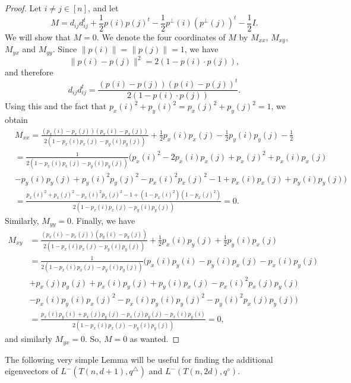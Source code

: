 \documentclass[a4paper,11pt]{article}
\theoremstyle{plain}
\theoremstyle{definition}
\begin{document}
\begin{proof}
Let $i\neq j\in[n]$, and let
\[
    M= d_{i j} d_{i j}^t+ \frac{1}{2} p(i)p(j)^t- \frac{1}{2}p^{\perp}(i) (p^{\perp}(j))^t  - \frac{1}{2} I.
\]
We will show that $M=0$. We denote the four coordinates of $M$ by $M_{x x}$, $M_{x y}$, $M_{y x}$ and $M_{y y}$. Since $\|p(i)\|=\|p(j)\|=1$, we have
\[
    \|p(i)-p(j)\|^2 = 2(1-p(i)\cdot p(j)),
\]
and therefore
\[
d_{i j} d_{i j}^t= \frac{(p(i)-p(j))(p(i)-p(j))^t}{2(1-p(i)\cdot p(j))}.
\]
Using this and the fact that $p_x(i)^2+p_y(i)^2=p_x(j)^2+p_y(j)^2=1$, we obtain
\begin{align*}
&M_{x x}= \frac{(p_x(i)-p_x(j))(p_x(i)-p_x(j))}{2(1-p_x(i)p_x(j)-p_y(i)p_y(j))} +\frac{1}{2}p_x(i)p_x(j)-\frac{1}{2}p_y(i)p_y(j)-\frac{1}{2}
\\&= \frac{1}{2(1-p_x(i)p_x(j)-p_y(i)p_y(j))}\big( p_x(i)^2-2p_x(i)p_x(j)+p_x(j)^2 +p_x(i)p_x(j)\\&-p_y(i)p_y(j)
+p_y(i)^2p_y(j)^2-p_x(i)^2 p_x(j)^2 -1 +p_x(i)p_x(j)+p_y(i)p_y(j)
\big)
\\
&=\frac{p_x(i)^2 + p_x(j)^2 -p_x(i)^2p_x(j)^2-1 +(1-p_x(i)^2)(1-p_x(j)^2)}{2(1-p_x(i)p_x(j)-p_y(i)p_y(j))}=0.
\end{align*}
Similarly, $M_{y y}=0$. Finally, we have
\begin{align*}
M_{x y}&= \frac{(p_x(i)-p_x(j))(p_y(i)-p_y(j))}{2(1-p_x(i)p_x(j)-p_y(i)p_y(j))} +\frac{1}{2}p_x(i)p_y(j)+\frac{1}{2}p_y(i)p_x(j)
\\&= 
\frac{1}
{2(1-p_x(i)p_x(j)-p_y(i)p_y(j))}
\big(
p_x(i)p_y(i)-p_y(i)p_x(j)-p_x(i)p_y(j)\\&+p_x(j)p_y(j)
+p_x(i)p_y(j)+p_y(i)p_x(j)
-p_x(i)^2 p_x(j)p_y(j)\\
&-p_x(i)p_y(i)p_x(j)^2  -p_x(i)p_y(i)p_y(j)^2 -p_y(i)^2p_x(j)p_y(j)
\big)
\\
&=\frac{p_x(i)p_y(i)+p_x(j)p_y(j)
-p_x(j)p_y(j)
-p_x(i)p_y(i)}
{2(1-p_x(i)p_x(j)-p_y(i)p_y(j))}
=0,
\end{align*}
and similarly $M_{y x}=0$. So, $M=0$ as wanted.
\end{proof}


The following very simple Lemma will be useful for finding the additional eigenvectors of $L^{-}(T(n,d+1),q^{\triangle})$ and $L^{-}(T(n,2d),q^{\diamond})$.
\end{document}
